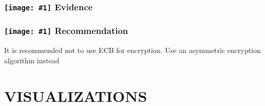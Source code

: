 \documentclass[12p]{article}
\newcommand{\icon}[1]{\texttt{[image: \#1]}}
\begin{document}
\subsubsection*{\protect\icon{/home/miki/Documents/GITHUB/AndroidPermissions/python/vulns/report_icons/basic_magnifier.png} Evidence}

\subsubsection*{\protect\icon{/home/miki/Documents/GITHUB/AndroidPermissions/python/vulns/report_icons/basic_todo.png} Recommendation}
It is recommended not to use ECB for encryption. Use an asymmetric encryption algorithm instead
\cleardoublepage
\newpage
\section{VISUALIZATIONS}
\end{document}

